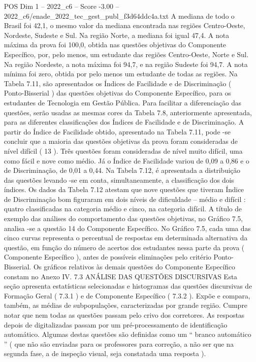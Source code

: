 \begin{textsample}{POS Dim 1 – 2022\_c6 – Score -3.00 – 2022\_c6/enade\_2022\_tec\_gest\_publ\_f3d64ddc4a.txt}
A mediana de todo o Brasil foi 42,1, o mesmo valor da mediana encontrada nas regiões Centro-Oeste, Nordeste, Sudeste e Sul.
Na região Norte, a mediana foi igual 47,4.
A nota máxima da prova foi 100,0, obtida nas questões objetivas do Componente Específico, por, pelo menos, um estudante das regiões Centro-Oeste, Norte e Sul.
Na região Nordeste, a nota máxima foi 94,7, e na região Sudeste foi 94,7.
A nota mínima foi zero, obtida por pelo menos um estudante de todas as regiões.
Na Tabela 7.11, são apresentados os Índices de Facilidade e de Discriminação ( Ponto-Bisserial ) das questões objetivas do Componente Específico, para os estudantes de Tecnologia em Gestão Pública.
Para facilitar a diferenciação das questões, serão usadas as mesmas cores da Tabela 7.8, anteriormente apresentada, para as diferentes classificações dos Índices de Facilidade e de Discriminação.
A partir do Índice de Facilidade obtido, apresentado na Tabela 7.11, pode -se concluir que a maioria das questões objetivas da prova foram consideradas de nível difícil ( 13 ).
Três questões foram consideradas de nível muito difícil, uma como fácil e nove como médio.
Já o Índice de Facilidade variou de 0,09 a 0,86 e o de Discriminação, de 0,01 a 0,44.
Na Tabela 7.12, é apresentada a distribuição das questões levando -se em conta, simultaneamente, a classificação dos dois índices.
Os dados da Tabela 7.12 atestam que nove questões que tiveram Índice de Discriminação bom figuraram em dois níveis de dificuldade – médio e difícil : quatro classificadas na categoria médio e cinco, na categoria difícil.
A título de exemplo das análises do comportamento das questões objetivas, no Gráfico 7.5, analisa -se a questão 14 do Componente Específico.
No Gráfico 7.5, cada uma das cinco curvas representa o percentual de respostas em determinada alternativa da questão, em função do número de acertos dos estudantes nessa parte da prova ( Componente Específico ), antes de possíveis eliminações pelo critério Ponto-Bisserial.
Os gráficos relativos às demais questões do Componente Específico constam no Anexo IV. 7.3 ANÁLISE DAS QUESTÕES DISCURSIVAS Esta seção apresenta estatísticas selecionadas e histogramas das questões discursivas de Formação Geral ( 7.3.1 ) e de Componente Específico ( 7.3.2 ).
Expõe e compara, também, as médias de subpopulações, caracterizadas por grande região.
Cumpre notar que nem todas as questões passam pelo crivo dos corretores.
As respostas depois de digitalizadas passam por um pré-processamento de identificação automático.
Algumas destas questões são definidas como um “ branco automático ” ( que não são enviadas para os professores para correção, a não ser que na segunda fase, a de inspeção visual, seja constatada uma resposta ).

\end{textsample}
